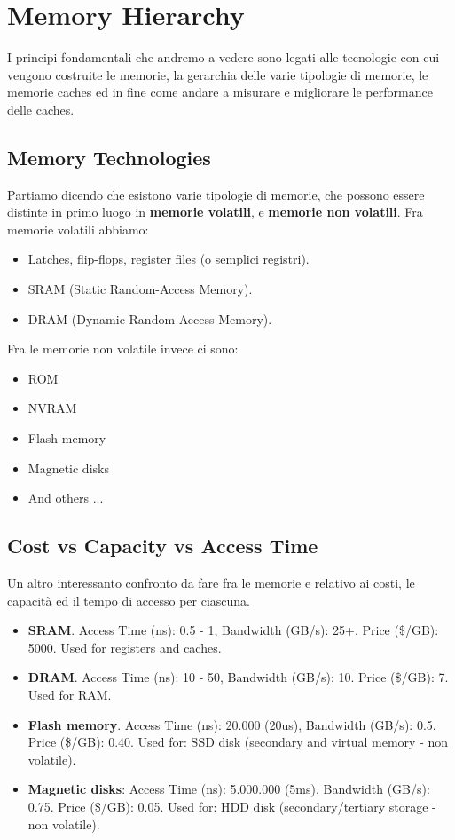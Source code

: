 \section{Memory Hierarchy}
I principi fondamentali che andremo a vedere sono legati alle tecnologie con cui vengono costruite le memorie, la gerarchia delle varie tipologie di memorie, le memorie caches ed in fine come andare a misurare e migliorare le performance delle caches.

\subsection{Memory Technologies}
Partiamo dicendo che esistono varie tipologie di memorie, che possono essere distinte in primo luogo in \textbf{memorie volatili}, e \textbf{memorie non volatili}. Fra memorie volatili abbiamo:
\begin{itemize}
    \item Latches, flip-flops, register files (o semplici registri).
    \item SRAM (Static Random-Access Memory).
    \item DRAM (Dynamic Random-Access Memory).
\end{itemize}

\hspace{-15pt}Fra le memorie non volatile invece ci sono:
\begin{itemize}
    \item ROM
    \item NVRAM
    \item Flash memory
    \item Magnetic disks
    \item And others ...
\end{itemize}

\subsection{Cost vs Capacity vs Access Time}
Un altro interessanto confronto da fare fra le memorie e relativo ai costi, le capacità ed il tempo di accesso per ciascuna.
\begin{itemize}
    \item \textbf{SRAM}. Access Time (ns): 0.5 - 1, Bandwidth (GB/s): 25+. Price (\$/GB): 5000. Used for registers and caches.
    \item \textbf{DRAM}. Access Time (ns): 10 - 50, Bandwidth (GB/s): 10. Price (\$/GB): 7. Used for RAM.
    \item \textbf{Flash memory}. Access Time (ns): 20.000 (20us), Bandwidth (GB/s): 0.5. Price (\$/GB): 0.40. Used for: SSD disk (secondary and virtual memory - non volatile).
    \item \textbf{Magnetic disks}: Access Time (ns): 5.000.000 (5ms), Bandwidth (GB/s): 0.75. Price (\$/GB): 0.05. Used for: HDD disk (secondary/tertiary storage - non volatile).
\end{itemize}


